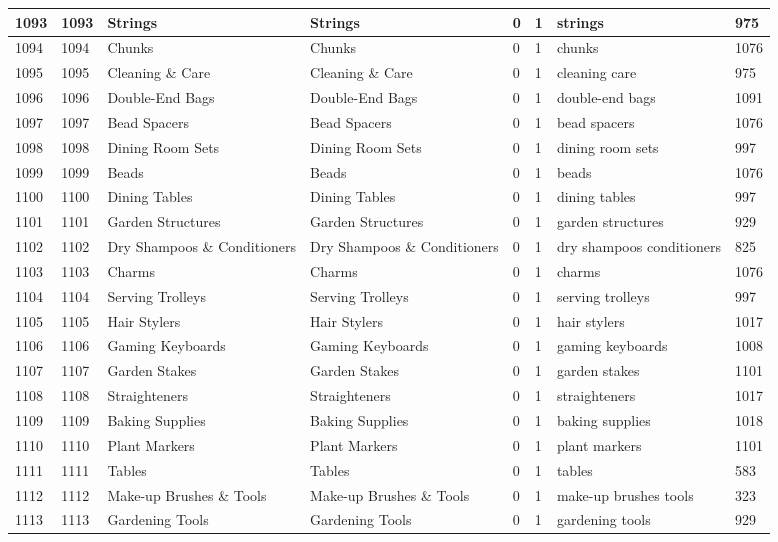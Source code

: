 \begin{longtable}{|l|l|l|l|l|l|l|l|}
1093 & 1093 & Strings & Strings & 0 & 1 & strings & 975 \\ \hline 
1094 & 1094 & Chunks & Chunks & 0 & 1 & chunks & 1076 \\ \hline 
1095 & 1095 & Cleaning \& Care & Cleaning \& Care & 0 & 1 & cleaning care & 975 \\ \hline 
1096 & 1096 & Double-End Bags & Double-End Bags & 0 & 1 & double-end bags & 1091 \\ \hline 
1097 & 1097 & Bead Spacers & Bead Spacers & 0 & 1 & bead spacers & 1076 \\ \hline 
1098 & 1098 & Dining Room Sets & Dining Room Sets & 0 & 1 & dining room sets & 997 \\ \hline 
1099 & 1099 & Beads & Beads & 0 & 1 & beads & 1076 \\ \hline 
1100 & 1100 & Dining Tables & Dining Tables & 0 & 1 & dining tables & 997 \\ \hline 
1101 & 1101 & Garden Structures & Garden Structures & 0 & 1 & garden structures & 929 \\ \hline 
1102 & 1102 & Dry Shampoos \& Conditioners & Dry Shampoos \& Conditioners & 0 & 1 & dry shampoos conditioners & 825 \\ \hline 
1103 & 1103 & Charms & Charms & 0 & 1 & charms & 1076 \\ \hline 
1104 & 1104 & Serving Trolleys & Serving Trolleys & 0 & 1 & serving trolleys & 997 \\ \hline 
1105 & 1105 & Hair Stylers & Hair Stylers & 0 & 1 & hair stylers & 1017 \\ \hline 
1106 & 1106 & Gaming Keyboards & Gaming Keyboards & 0 & 1 & gaming keyboards & 1008 \\ \hline 
1107 & 1107 & Garden Stakes & Garden Stakes & 0 & 1 & garden stakes & 1101 \\ \hline 
1108 & 1108 & Straighteners & Straighteners & 0 & 1 & straighteners & 1017 \\ \hline 
1109 & 1109 & Baking Supplies & Baking Supplies & 0 & 1 & baking supplies & 1018 \\ \hline 
1110 & 1110 & Plant Markers & Plant Markers & 0 & 1 & plant markers & 1101 \\ \hline 
1111 & 1111 & Tables & Tables & 0 & 1 & tables & 583 \\ \hline 
1112 & 1112 & Make-up Brushes \& Tools & Make-up Brushes \& Tools & 0 & 1 & make-up brushes tools & 323 \\ \hline 
1113 & 1113 & Gardening Tools & Gardening Tools & 0 & 1 & gardening tools & 929 \\ \hline 

\end{longtable}
